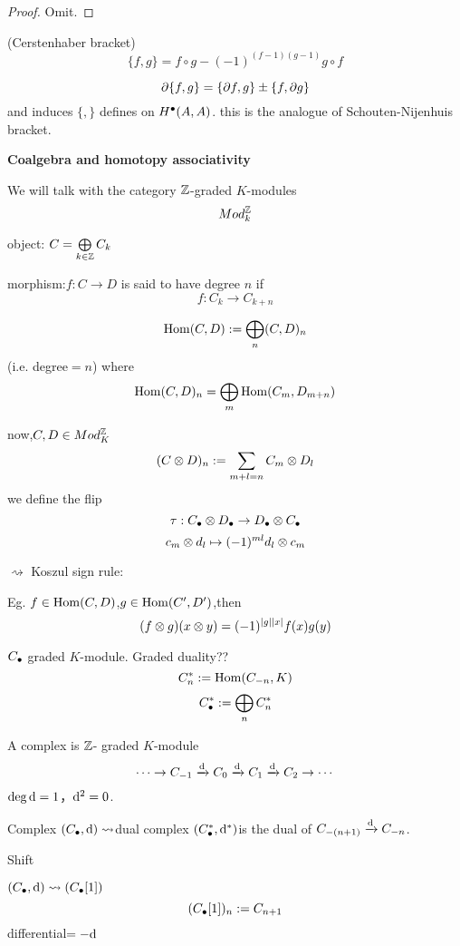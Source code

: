 \begin{proof}
Omit.
\end{proof}


\begin{definition}(Cerstenhaber bracket)
$$\{f,g\}=f\circ g-(-1)^{(f-1)(g-1)}g\circ f$$
\end{definition}

\begin{prop}
$$\partial\{f,g\}=\{\partial f,g\}\pm\{f,\partial g\}$$
and induces
$\{,\}$ defines on $H^{\bullet}(A,A)$.
this is  the analogue of Schouten-Nijenhuis bracket.
\end{prop}


\textbf{Coalgebra and homotopy associativity}

We will talk with the category
$\mathbb{Z}$-graded $K$-modules
$$Mod_k^{\mathbb{Z}}$$

object: $C=\bigoplus\limits_{k\in\mathbb{Z}}C_k$

morphism:$f:C\to D$ is said to have degree $n$ if 
$$f:C_k\to C_{k+n}$$

$$\operatorname{Hom}(C,D):=\bigoplus_n(C,D)_n$$
(i.e. degree$=n$)
where
$$\operatorname{Hom}(C,D)_n=\bigoplus_m\operatorname{Hom}(C_m,D_{m+n})$$

now,$C,D\in Mod_{K}^{\mathbb{Z}}$
$$(C\otimes D)_n:=\sum_{m+l=n}C_m\otimes D_l$$
we define the flip
$$\tau:C_{\bullet}\otimes D_{\bullet}\to D_{\bullet}\otimes C_{\bullet}$$
$$c_m\otimes d_l\mapsto(-1)^{ml}d_l\otimes c_m$$

$\rightsquigarrow$ Koszul sign rule:

Eg. $f\in\operatorname{Hom}(C,D)$,$g\in\operatorname{Hom}(C',D')$,then
$$(f\otimes g)(x\otimes y)=(-1)^{|g||x|}f(x)g(y)$$

$C_{\bullet}$ graded $K$-module. Graded duality??
$$C^*_n:=\operatorname{Hom}(C_{-n},K)$$
$$C^*_{\bullet}:=\bigoplus_n C_n^*$$

A complex is $\mathbb{Z}$- graded $K$-module
$$\cdots\to C_{-1}\xrightarrow{\mathrm{d}}C_0\xrightarrow{\mathrm{d}}C_1\xrightarrow{\mathrm{d}}C_2\to\cdots$$
$\deg\mathrm{d}=1$，$\mathrm{d}^2=0$.

Complex $(C_{\bullet},\mathrm{d})\rightsquigarrow$dual complex
$(C_{\bullet}^*,\mathrm{d}^*)$is the dual of
$C_{-(n+1)}\xrightarrow{\mathrm{d}}C_{-n}$.

Shift

$(C_{\bullet},\mathrm{d})\rightsquigarrow(C_{\bullet}[1])$
$$(C_{\bullet}[1])_n:=C_{n+1}$$
differential$=-\mathrm{d}$

